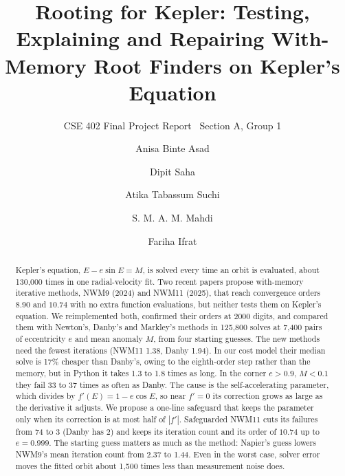 \documentclass[sigconf,nonacm]{acmart}
\begin{document}
\title{Rooting for Kepler: Testing, Explaining and Repairing
With-Memory Root Finders on Kepler's Equation}

\subtitle{CSE 402 Final Project Report \textbar\ Section A, Group 1}

\author{Anisa Binte Asad}
\author{Dipit Saha}
\author{Atika Tabassum Suchi}
\author{S. M. A. M. Mahdi}
\author{Fariha Ifrat}

\renewcommand{\shortauthors}{Section A, Group 1}

\begin{abstract}
Kepler's equation, $E - e\sin E = M$, is solved every time an orbit is
evaluated, about 130{,}000 times in one radial-velocity fit. Two recent
papers propose with-memory iterative methods, NWM9 (2024) and NWM11
(2025), that reach convergence orders $8.90$ and $10.74$ with no extra
function evaluations, but neither tests them on Kepler's equation. We
reimplemented both, confirmed their orders at 2000 digits, and compared
them with Newton's, Danby's and Markley's methods in 125{,}800 solves at
7{,}400 pairs of eccentricity $e$ and mean anomaly $M$, from four starting
guesses. The new methods need the fewest iterations (NWM11 1.38, Danby
1.94). In our cost model their median solve is 17\% cheaper than Danby's,
owing to the eighth-order step rather than the memory, but in Python it
takes 1.3 to 1.8 times as long. In the corner $e > 0.9$, $M < 0.1$ they
fail 33 to 37 times as often as Danby. The cause is the
self-accelerating parameter, which divides by $f'(E) = 1 - e\cos E$, so near
$f' = 0$ its correction grows as large as the derivative it adjusts. We
propose a one-line safeguard that keeps the parameter only when its
correction is at most half of $|f'|$. Safeguarded NWM11 cuts its failures
from 74 to 3 (Danby has 2) and keeps its iteration count and its order
of $10.74$ up to $e = 0.999$. The starting guess matters as
much as the method: Napier's guess lowers NWM9's mean iteration count from
2.37 to 1.44. Even in the worst case, solver error moves the fitted orbit
about 1{,}500 times less than measurement noise does.
\end{abstract}
\end{document}
